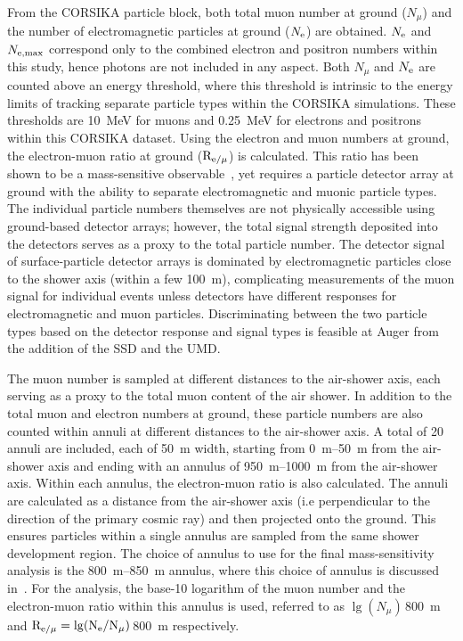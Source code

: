 From the CORSIKA particle block, both total muon number at ground ($N_{\mu}$) and the number of electromagnetic particles at ground ($N_{\rm e}$) are obtained.
$N_{\rm e}$ and $N_{\rm e, max}$ correspond only to the combined electron and positron numbers within this study, hence photons are not included in any aspect.
Both $N_{\mu}$ and $N_{\rm e}$ are counted above an energy threshold, where this threshold is intrinsic to the energy limits of tracking separate particle types within the CORSIKA simulations.
These thresholds are \qty{10}{\mega\electronvolt} for muons and \qty{0.25}{\mega\electronvolt} for electrons and positrons within this CORSIKA dataset.
Using the electron and muon numbers at ground, the electron-muon ratio at ground ($\rm R_{\rm e/\mu}$) is calculated.
This ratio has been shown to be a mass-sensitive observable~\cite{kascade_astropartphys2008}, yet requires a particle detector array at ground with the ability to separate electromagnetic and muonic particle types.
The individual particle numbers themselves are not physically accessible using ground-based detector arrays; however, the total signal strength deposited into the detectors serves as a proxy to the total particle number. 
The detector signal of surface-particle detector arrays is dominated by electromagnetic particles close to the shower axis (within a few \qty{100}{\meter}), complicating measurements of the muon signal for individual events unless detectors have different responses for electromagnetic and muon particles.
Discriminating between the two particle types based on the detector response and signal types is feasible at Auger from the addition of the SSD and the UMD.

The muon number is sampled at different distances to the air-shower axis, each serving as a proxy to the total muon content of the air shower. 
In addition to the total muon and electron numbers at ground, these particle numbers are also counted within annuli at different distances to the air-shower axis.
A total of 20 annuli are included, each of \qty{50}{\meter} width, starting from \qtyrange{0}{50}{\meter} from the air-shower axis and ending with an annulus of \qtyrange{950}{1000}{\meter} from the air-shower axis.
Within each annulus, the electron-muon ratio is also calculated.
The annuli are calculated as a distance from the air-shower axis (i.e perpendicular to the direction of the primary cosmic ray) and then projected onto the ground.
This ensures particles within a single annulus are sampled from the same shower development region.
The choice of annulus to use for the final mass-sensitivity analysis is the \qtyrange{800}{850}{\meter} annulus, where this choice of annulus is discussed in~.
For the analysis, the base-10 logarithm of the muon number and the electron-muon ratio within this annulus is used, referred to as $\lg(N_{\mu})$\,\qty{800}{\meter} and $\rm R_{\rm e/\mu} = \lg(N_{\rm e} / N_{\mu})$\,\qty{800}{\meter} respectively.

